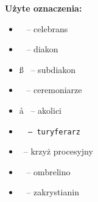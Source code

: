 \begin{center}
	\vspace*{2cm}


	\vspace{\fill}

	{\large \textbf{Użyte oznaczenia:}} \\

	\vspace{0.1\textwidth}

	{\large\centering
		\begin{itemize}[leftmargin=.43\linewidth,rightmargin=.35\linewidth,label=]
			\item \ii~ -- celebrans
			\item \dd~ -- diakon
			\item \ss~ -- subdiakon
			\item \cc~ -- ceremoniarze
			\item \aa~ -- akolici
			\item \tt~ -- turyferarz
			\item {}~-- krzyż procesyjny
			\item \oo~ -- ombrelino
			\item \zz~ -- zakrystianin
		\end{itemize}
	}

	\vspace{\fill}

\end{center}

